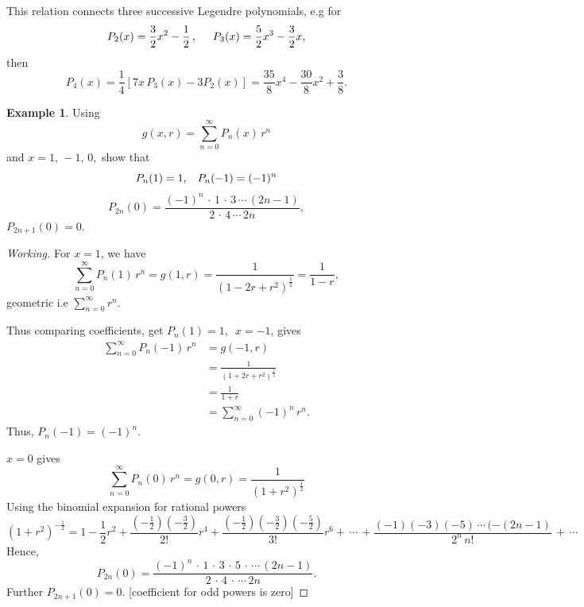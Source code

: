 \documentclass[12pt,a4paper]{report}
\theoremstyle{definition}
\newtheorem{exa}[thm]{Example}
\theoremstyle{plain}
\begin{document}
This relation connects three successive Legendre polynomials, e.g for $$P_2(x) = \frac{3}{2}x^2 - \frac{1}{2}\, , \hspace{0.5cm} P_3(x) = \frac{5}{2}x^3 - \frac{3}{2}x,$$ then 
$$P_4(x) = \frac{1}{4}\left[7x\, P_3(x) - 3P_2(x)\right] = \frac{35}{8}x^4 - \frac{30}{8}x^2 + \frac{3}{8}.$$
\vspace{6pt}





\begin{exa}
Using $$g(x,r) = \sum_{n=0}^{\infty} P_n(x)\, r^n$$ and $x = 1,\, -1, \, 0,$ show that 
$$P_n(1) = 1, \hspace{0.3cm} P_n(-1) = (-1)^n$$
$$ P_{2n}(0) = \frac{(-1)^n\, \cdot\, 1\, \cdot\, 3\, \cdots\, (2n-1)}{2\, \cdot\, 4\, \cdots \, 2n},$$ 
$P_{2n+1}(0)  = 0.$
\end{exa}


\begin{proof}[Working]
For $x = 1$, we have $$\sum_{n=0}^{\infty} P_n(1)\, r^n = g(1,r) = \frac{1}{(1 - 2r + r^2)^{\frac{1}{2}}}  = \frac{1}{1 - r},$$
geometric i.e $\sum^{\infty}_{n=0} r^n.$


Thus comparing coefficients, get $P_n(1) = 1,$ $\, x = -1$, gives
\begin{align*}
\sum_{n=0}^{\infty} P_n(-1)\, r^n & = g(-1,r)\\
                                  & = \frac{1}{(1 + 2r + r^2)^{\frac{1}{2}}}\\
                                  & = \frac{1}{1 + r}\\
                                  & = \sum^{\infty}_{n=0} (-1)^n\, r^n.
\end{align*}
Thus, $P_n(-1) = (-1)^n.$

$x  = 0$ gives
$$\sum_{n=0}^{\infty} P_n(0)\, r^n = g(0,r) = \frac{1}{(1 + r^2)^{\frac{1}{2}}}$$
Using the binomial  expansion for rational powers
$$(1 + r^2)^{-\frac{1}{2}} = 1 - \frac{1}{2}r^2 + \frac{\left(-\frac{1}{2}\right)\left(-\frac{3}{2}\right)}{2!} r^4 + \frac{\left(-\frac{1}{2}\right)\left(-\frac{3}{2}\right)\left(-\frac{5}{2}\right)}{3!} r^6 + \, \cdots\, + \frac{(-1)(-3)(-5)\, \cdots\, (-(2n-1)}{2^n\, n!} \, + \, \cdots$$
Hence, 
$$P_{2n}(0) = \frac{(-1)^n\, \cdot\, 1\, \cdot\, 3\, \cdot\, 5\, \cdot\, \cdots\, (2n-1)}{2\, \cdot\, 4\, \cdot\, \cdots\, 2n}.$$
Further $P_{2n+1}(0) = 0.$ [coefficient for odd powers is zero]
\end{proof}
\end{document}
